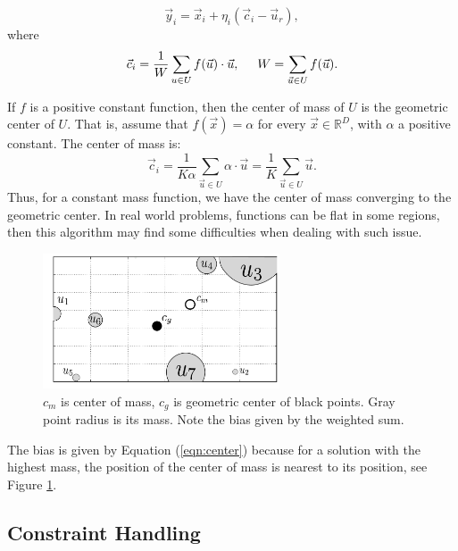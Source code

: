 \documentclass[conference]{IEEEtran}
\begin{document}
\begin{equation}
	\vec{y}_i = \vec{x}_i + \eta _{i} ( \vec{c}_i - \vec{u}_{r} ),
	\label{eqn:vcu}
\end{equation}
%
where 
%
\begin{equation}
	\vec{c}_i = \dfrac{1} {W} \sum_{u \in U} f(\vec{u}) \cdot \vec{u} , 
			\hspace{0.5cm} 
			W = \sum_{ \vec{u} \in U} f(\vec{u}).
	\label{eqn:center}
\end{equation}

If $f$ is a positive constant function, then the center of mass of $U$ is the geometric 
center of  $U$. That is, assume that $f(\vec{x}) = \alpha$ for every 
$\vec{x} \in \mathbb{R}^D$,  with $\alpha$ a positive constant. The 
center of mass is:
%
%
\begin{equation}
	\vec{c}_i = \dfrac{1} {K \alpha} \sum_{ \vec{u} \in U} \alpha \cdot \vec{u} %
			  =  \dfrac{1} {K } \sum_{\vec{u} \in U} \vec{u}.
	\label{eqn:center-geometric}
\end{equation}
%
%
Thus, for a constant mass function, we have the center of mass converging 
to the geometric center. In real world problems, functions can be flat 
in some regions, then this algorithm may find some difficulties  when 
dealing with such issue.

\begin{figure}[!ht]
	\centering
	\includegraphics[width=7cm]{img/masses.pdf}
	\caption{$c_m$ is center of mass, $c_g$ is geometric center of black points. %
	Gray point radius is its mass. Note the bias given by the weighted sum.}
	\label{fig:masses}       %
\end{figure}
%
%
The bias is given by Equation (\ref{eqn:center}) because for a solution 
with the highest mass, the position of the center of mass is nearest to 
its position, see Figure \ref{fig:masses}.
%

\subsection{Constraint Handling} %
\label{sec:constraint_handling}
\end{document}
